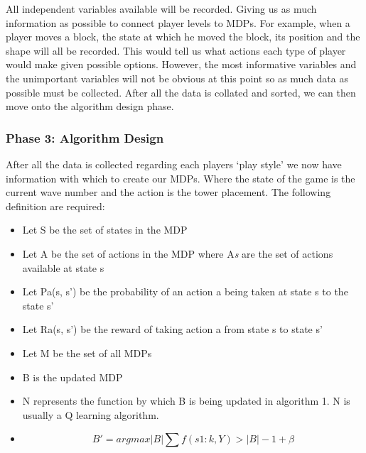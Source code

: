 \documentclass[11pt]{article}
\begin{document}
All independent variables available will be recorded. Giving us as much information as possible to connect player levels to MDPs. For example, when a player moves a block, the state at which he moved the block, its position and the shape will all be recorded. This would tell us what actions each type of player would make given possible options. However, the most informative variables and the unimportant variables will not be obvious at this point so as much data as possible must be collected. After all the data is collated and sorted, we can then move onto the algorithm design phase.
\vspace{6.0 mm}

\subsubsection{Phase 3: Algorithm Design}

After all the data is collected regarding each players `play style' we now have information with which to create our MDPs. Where the state of the game is the current wave number and the action is the tower placement. The following definition are required:
\vspace{6.0 mm}

\begin{itemize}
	\item Let S be the set of states in the MDP
	\item Let A be the set of actions in the MDP where A\textit{s} are the set of actions available at state s
	\item Let Pa(s, s') be the probability of an action a being taken at state s to the state s'
	\item Let Ra(s, s') be the reward of taking action a from state s to state s'
	\item Let M be the set of all MDPs
	\item B is the updated MDP
	\item N represents the function by which B is being updated in algorithm 1. N is usually a Q learning algorithm.
	\item  
	\begin{equation}
	B' =  argmax{|B| \sum f(s1:k, Y) > |B| - 1 + \beta}
	\end{equation}
	
\end{itemize}

\clearpage
\end{document}
